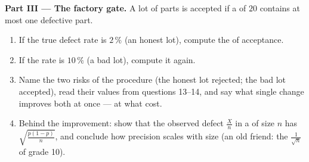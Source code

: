 \begin{problem}
\medskip
\noindent\textbf{Part III --- The factory gate.}
A lot of parts is accepted if a  of $20$ contains at most
one defective part.
\begin{enumerate}[resume]
  \item If the true defect rate is $2\,\%$ (an honest lot),
        compute the  of acceptance.
  \item If the rate is $10\,\%$ (a bad lot), compute it again.
  \item Name the two risks of the procedure (the honest lot
        rejected; the bad lot accepted), read their values from
        questions 13--14, and say what single change improves
        both at once --- at what cost.
  \item Behind the improvement: show that the observed defect
        \emph{} $\frac Xn$ in a  of size $n$ has
         $\sqrt{\frac{p(1-p)}{n}}$, and
        conclude how precision scales with  size (an old
        friend: the $\frac{1}{\sqrt n}$ of grade 10).
\end{enumerate}


\end{problem}
